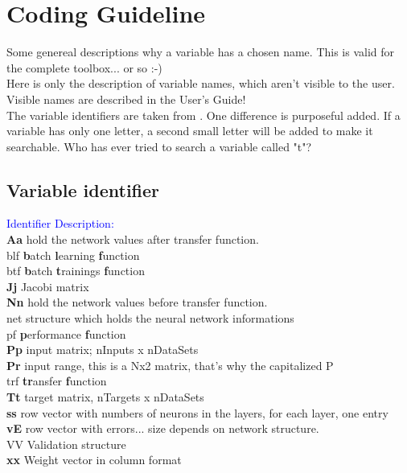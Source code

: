 \chapter{Coding Guideline}
Some genereal descriptions why a variable has a chosen name. This is valid for the complete
toolbox... or so :-)\\
Here is only the description of variable names, which aren't visible to the user. Visible names are
described in the User's Guide!\\
The variable identifiers are taken from \cite{4}. One difference is purposeful added. If a variable has only one letter, a second small letter will be added to make it searchable. Who has ever tried to search a variable called "t"?

\section{Variable identifier}

\begin{tabbing}
\hspace*{1em} \= \textcolor{blue}{Identifier} \hspace*{3em}\= \textcolor{blue}{Description:} \\ 
  \textbf{Aa} \> \> hold the network values after transfer function.\\
  blf \>  \> \textbf{b}atch \textbf{l}earning \textbf{f}unction \\
  btf  \>  \> \textbf{b}atch \textbf{t}rainings \textbf{f}unction \\
  \textbf{Jj} \>  \> Jacobi matrix \\
  \textbf{Nn}  \> \> hold the network values before transfer function.\\  						
  net	\> \> structure which holds the neural network informations \\
  pf \>  \> \textbf{p}erformance \textbf{f}unction \\
  \textbf{Pp}				\>						\>input matrix; nInputs x nDataSets  \\
  \textbf{Pr}	\>		\> input range, this is a Nx2 matrix, that's why the capitalized P \\
  trf \>  \> \textbf{tr}ansfer \textbf{f}unction \\
  \textbf{Tt} \>  \> target matrix, nTargets x nDataSets\\
  \textbf{ss}	\> \> row vector with numbers of neurons in the layers, for each layer, one entry \\
  \textbf{vE}	\> \> row vector with errors... size depends on network structure. \\
  VV \>  \> Validation structure \\
  \textbf{xx} \>  \> Weight vector in column format\\
  
\end{tabbing}


